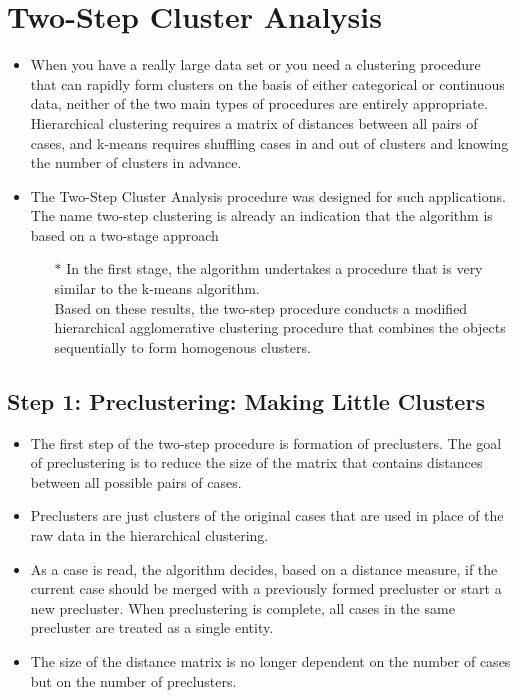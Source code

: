 \documentclass[a4paper,12pt]{article}
\begin{document}
\section{Two-Step Cluster Analysis}
\begin{itemize}
	\item 
	
	When you have a really large data set or you need a clustering procedure that can rapidly form clusters on the basis of either categorical or continuous data, neither of the two main types of procedures are entirely appropriate. Hierarchical clustering requires a matrix of distances between all pairs of cases, and k-means requires shuffling cases in and out of clusters and knowing the number of clusters in advance.
	
	\item The Two-Step Cluster Analysis procedure was designed for such applications. The name two-step clustering is already an indication that the algorithm is based on a two-stage approach
	\begin{itemize}
		\item[$\ast$] In the first stage, the algorithm undertakes a procedure that is very similar to the k-means algorithm. \\Based on these results, the two-step
		procedure conducts a modified hierarchical agglomerative clustering procedure that
		combines the objects sequentially to form homogenous clusters.

		
\end{itemize}
\end{itemize}
	\subsection{Step 1: Preclustering: Making Little Clusters}
	\begin{itemize}
		\item The first step of the two-step procedure is formation of preclusters. The goal of
		preclustering is to reduce the size of the matrix that contains distances between all
		possible pairs of cases.    \item Preclusters are just clusters of the original cases that are used
		in place of the raw data in the hierarchical clustering.     \item As a case is read, the algorithm
		decides, based on a distance measure, if the current case should be merged with a
		previously formed precluster or start a new precluster. When preclustering is complete,
		all cases in the same precluster are treated as a single entity.     \item The size of the distance
		matrix is no longer dependent on the number of cases but on the number of preclusters.
	\end{itemize}
\end{document}
